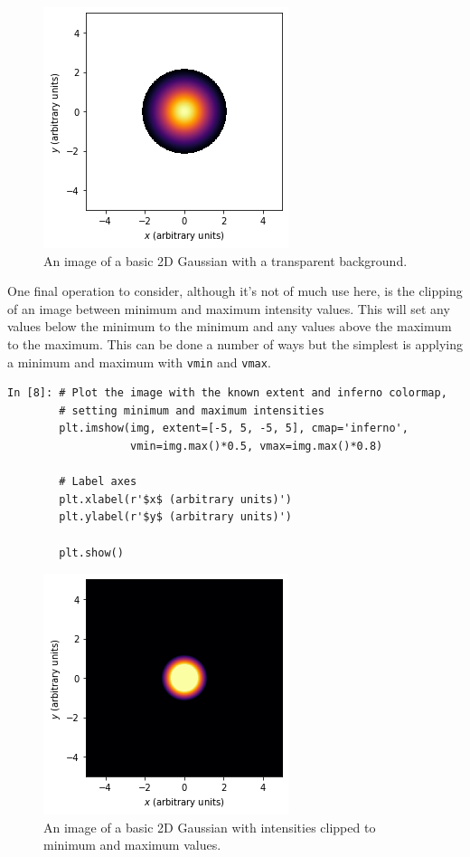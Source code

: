 \begin{figure}[H]
	\centering
	\includegraphics[scale=0.7]{Pictures/gaussimgexampletransparent.png}
\caption{An image of a basic 2D Gaussian with a transparent background.}
\label{fig:randimgnoax}
\end{figure}

One final operation to consider, although it's not of much use here, is the clipping of an image between minimum and maximum intensity values. This will set any values below the minimum to the minimum and any values above the maximum to the maximum. This can be done a number of ways but the simplest is applying a minimum and maximum with \texttt{vmin} and \texttt{vmax}.

\begin{lstlisting}[style=PY]
In [8]: # Plot the image with the known extent and inferno colormap, 
        # setting minimum and maximum intensities
        plt.imshow(img, extent=[-5, 5, -5, 5], cmap='inferno', 
                   vmin=img.max()*0.5, vmax=img.max()*0.8)
        
        # Label axes
        plt.xlabel(r'$x$ (arbitrary units)')
        plt.ylabel(r'$y$ (arbitrary units)')

        plt.show()
\end{lstlisting}

\begin{figure}[H]
	\centering
	\includegraphics[scale=0.7]{Pictures/gaussimgexamplevmin.png}
\caption{An image of a basic 2D Gaussian with intensities clipped to minimum and maximum values.}
\label{fig:randimgnoax}
\end{figure}

